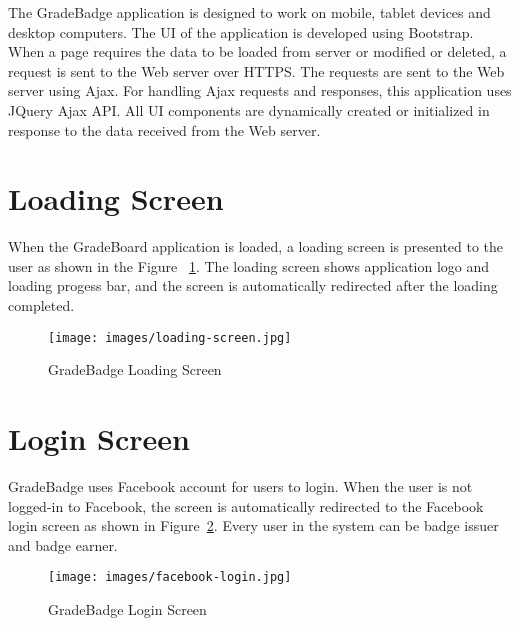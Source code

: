 
The GradeBadge application is designed to work on mobile, tablet devices and desktop computers. The UI of the application is developed using Bootstrap. When a page requires the data to be loaded from server or modified or deleted, a request is sent to the Web server over  HTTPS. The requests are sent to the Web server using Ajax. For handling Ajax requests and responses, this application uses JQuery Ajax API. All UI components are dynamically created or initialized in response to the data received from the Web server.

\newpage
\section{Loading Screen}
When the GradeBoard application is loaded, a loading screen is presented to the user as shown in the Figure ~\ref{fig:loading_screen}. The loading screen shows application logo and loading progess bar, and the screen is automatically redirected after the loading completed. 

\vspace{3em}
\begin{figure}[H]
\begin{center}
\texttt{[image: images/loading-screen.jpg]}
\caption{GradeBadge Loading Screen}
\label{fig:loading_screen}
\end{center}
\end{figure}

\newpage
\section{Login Screen}
GradeBadge uses Facebook account for users to login. When the user is not logged-in to Facebook, the screen is automatically redirected to the Facebook login screen as shown in Figure~\ref{fig:login_screen}. Every user in the system can be badge issuer and badge earner.

\vspace{3em}
\begin{figure}[H]
\begin{center}
\texttt{[image: images/facebook-login.jpg]}
\caption{GradeBadge Login Screen}
\label{fig:login_screen}
\end{center}
\end{figure}

